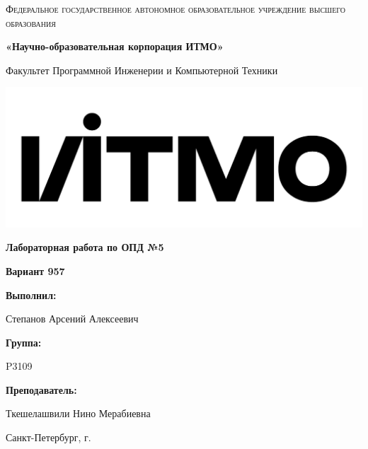 \documentclass[12pt,a4paper]{report}
\begin{document}
\begin{titlepage} 
	\centering
	{
        \scshape
        Федеральное государственное автономное образовательное учреждение высшего образования
        \par
        \textbf{«Научно-образовательная корпорация ИТМО»}
        \par
        \vspace*{1cm}
        Факультет Программной Инженерии и Компьютерной Техники
        \par
    }
    \vspace*{0.6cm}
    \includegraphics[width=\textwidth]{logo.png}
    {
        \Large
        \textbf{Лабораторная работа по ОПД №5}
        \par
        \normalsize
        \vspace*{0.75cm}
        \textbf{Вариант 957}
        \par
    }
    \vfill
    \hfill\begin{minipage}{\dimexpr\textwidth-7.8cm}
        \textbf{Выполнил:}\par
        Степанов Арсений Алексеевич\par
        \vspace*{0.15cm}
        \textbf{Группа:}\par
        P3109\par
        \vspace*{0.15cm}
        \textbf{Преподаватель:}\par
        Ткешелашвили Нино Мерабиевна\par
    \end{minipage}
    \vfill
    Санкт-Петербург, \the\year{}г.
\end{titlepage}  
\end{document}
